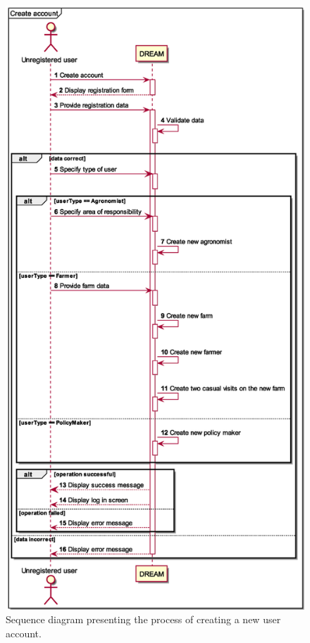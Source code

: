 \begin{figure}[H]
    \centering
    \includegraphics[scale=0.5, keepaspectratio, origin=c]{diagrams/sequence/create_account}
    \caption{Sequence diagram presenting the process of creating a new user account.}
    \label{fig:sd_create_account}
\end{figure}

